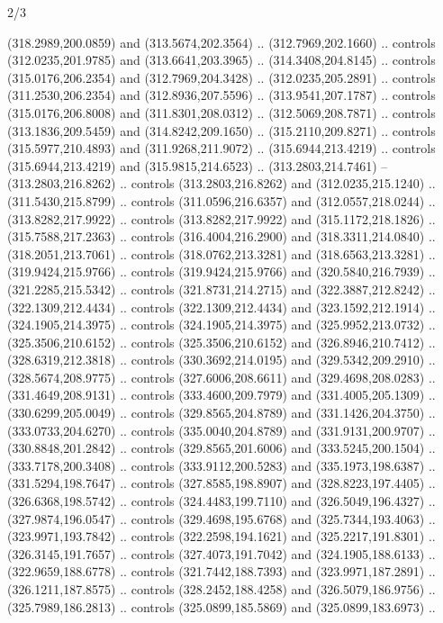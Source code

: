 \begin{flagdescription}{2/3}
\begin{scope}[xshift=0.5\flaglength,yshift=0.5\flagwidth,scale=\flagwidth/318.91]
\begin{scope}[y=0.8pt, x=0.8pt, yscale=-1,shift={(-298.97,-199.32)}]
  (318.2989,200.0859) and (313.5674,202.3564) .. (312.7969,202.1660) .. controls
  (312.0235,201.9785) and (313.6641,203.3965) .. (314.3408,204.8145) .. controls
  (315.0176,206.2354) and (312.7969,204.3428) .. (312.0235,205.2891) .. controls
  (311.2530,206.2354) and (312.8936,207.5596) .. (313.9541,207.1787) .. controls
  (315.0176,206.8008) and (311.8301,208.0312) .. (312.5069,208.7871) .. controls
  (313.1836,209.5459) and (314.8242,209.1650) .. (315.2110,209.8271) .. controls
  (315.5977,210.4893) and (311.9268,211.9072) .. (315.6944,213.4219) .. controls
  (315.6944,213.4219) and (315.9815,214.6523) .. (313.2803,214.7461) --
  (313.2803,216.8262) .. controls (313.2803,216.8262) and (312.0235,215.1240) ..
  (311.5430,215.8799) .. controls (311.0596,216.6357) and (312.0557,218.0244) ..
  (313.8282,217.9922) .. controls (313.8282,217.9922) and (315.1172,218.1826) ..
  (315.7588,217.2363) .. controls (316.4004,216.2900) and (318.3311,214.0840) ..
  (318.2051,213.7061) .. controls (318.0762,213.3281) and (318.6563,213.3281) ..
  (319.9424,215.9766) .. controls (319.9424,215.9766) and (320.5840,216.7939) ..
  (321.2285,215.5342) .. controls (321.8731,214.2715) and (322.3887,212.8242) ..
  (322.1309,212.4434) .. controls (322.1309,212.4434) and (323.1592,212.1914) ..
  (324.1905,214.3975) .. controls (324.1905,214.3975) and (325.9952,213.0732) ..
  (325.3506,210.6152) .. controls (325.3506,210.6152) and (326.8946,210.7412) ..
  (328.6319,212.3818) .. controls (330.3692,214.0195) and (329.5342,209.2910) ..
  (328.5674,208.9775) .. controls (327.6006,208.6611) and (329.4698,208.0283) ..
  (331.4649,208.9131) .. controls (333.4600,209.7979) and (331.4005,205.1309) ..
  (330.6299,205.0049) .. controls (329.8565,204.8789) and (331.1426,204.3750) ..
  (333.0733,204.6270) .. controls (335.0040,204.8789) and (331.9131,200.9707) ..
  (330.8848,201.2842) .. controls (329.8565,201.6006) and (333.5245,200.1504) ..
  (333.7178,200.3408) .. controls (333.9112,200.5283) and (335.1973,198.6387) ..
  (331.5294,198.7647) .. controls (327.8585,198.8907) and (328.8223,197.4405) ..
  (326.6368,198.5742) .. controls (324.4483,199.7110) and (326.5049,196.4327) ..
  (327.9874,196.0547) .. controls (329.4698,195.6768) and (325.7344,193.4063) ..
  (323.9971,193.7842) .. controls (322.2598,194.1621) and (325.2217,191.8301) ..
  (326.3145,191.7657) .. controls (327.4073,191.7042) and (324.1905,188.6133) ..
  (322.9659,188.6778) .. controls (321.7442,188.7393) and (323.9971,187.2891) ..
  (326.1211,187.8575) .. controls (328.2452,188.4258) and (326.5079,186.9756) ..
  (325.7989,186.2813) .. controls (325.0899,185.5869) and (325.0899,183.6973) ..

\end{scope}
\end{scope}
\end{flagdescription}
